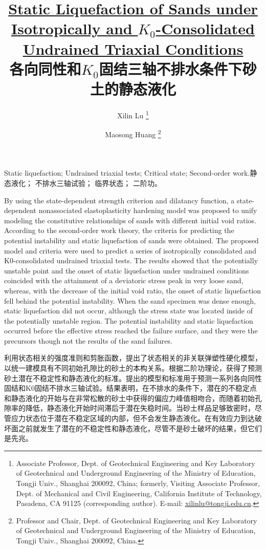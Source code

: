\documentclass{bilidoc}
\title{\textbf{\href{https://doi.org/10.1061/(ASCE)GT.1943-5606.0001206}{Static Liquefaction of Sands under Isotropically and $K_0$-Consolidated Undrained Triaxial Conditions }\\各向同性和$K_0$固结三轴不排水条件下砂土的静态液化}}
\author{Xilin Lu \thanks{
    Associate Professor, Dept. of Geotechnical Engineering and Key Laboratory of Geotechnical and Underground Engineering of the Ministry of Education, Tongji Univ., Shanghai 200092, China; formerly, Visiting Associate Professor, Dept. of Mechanical and Civil Engineering, California Institute of Technology, Pasadena, CA 91125 (corresponding author). E-mail: \url{xilinlu@tongji.edu.cn}.
} \and Maosong Huang \thanks{
    Professor and Chair, Dept. of Geotechnical Engineering and Key Laboratory of Geotechnical and Underground Engineering of the Ministry of Education, Tongji Univ., Shanghai 200092, China.
}}
\date{}
\begin{document}
\maketitle

\begin{Abstract}{Static liquefaction; Undrained triaxial tests; Critical state; Second-order work.}{静态液化； 不排水三轴试验； 临界状态； 二阶功。}

    By using the state-dependent strength criterion and dilatancy function, a state-dependent nonassociated elastoplasticity hardening model was proposed to unify modeling the constitutive relationships of sands with different initial void ratios. According to the second-order work theory, the criteria for predicting the potential instability and static liquefaction of sands were obtained. The proposed model and criteria were used to predict a series of isotropically consolidated and K0-consolidated undrained triaxial tests. The results showed that the potentially unstable point and the onset of static liquefaction under undrained conditions coincided with the attainment of a deviatoric stress peak in very loose sand, whereas, with the decrease of the initial void ratio, the onset of static liquefaction fell behind the potential instability. When the sand specimen was dense enough, static liquefaction did not occur, although the stress state was located inside of the potentially unstable region. The potential instability and static liquefaction occurred before the effective stress reached the failure surface, and they were the precursors though not the results of the sand failures.

    \switchcolumn

    利用状态相关的强度准则和剪胀函数，提出了状态相关的非关联弹塑性硬化模型，以统一建模具有不同初始孔隙比的砂土的本构关系。根据二阶功理论，获得了预测砂土潜在不稳定性和静态液化的标准。提出的模型和标准用于预测一系列各向同性固结和K0固结不排水三轴试验。结果表明，在不排水的条件下，潜在的不稳定点和静态液化的开始与在非常松散的砂土中获得的偏应力峰值相吻合，而随着初始孔隙率的降低，静态液化开始时间滞后于潜在失稳时间。当砂土样品足够致密时，尽管应力状态位于潜在不稳定区域的内部，但不会发生静态液化。在有效应力到达破坏面之前就发生了潜在的不稳定性和静态液化，尽管不是砂土破坏的结果，但它们是先兆。
    
\end{Abstract}












\begin{multicols}{2}
    
\end{multicols}


    
\end{document}
